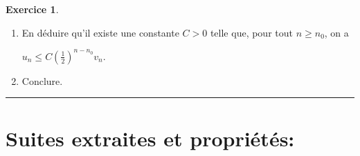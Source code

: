 \documentclass[a4paper,11pt]{article}
\theoremstyle{definition}
\newtheorem{exo}{Exercice} %
\begin{document}
\begin{minipage}{1\linewidth}
\begin{minipage}[t]{0.48\linewidth}
\begin{exo}
\begin{enumerate}
				\raggedright
				\item En déduire qu'il existe une constante $C>0$ telle que, pour tout $n\geq n_0$, on a
				
				\centering$u_n\leq C\left(\frac 12\right)^{n-n_0}v_n.$
				
				\raggedright
				\item Conclure.
			\end{enumerate}
			
			\centering
			\rule{1\linewidth}{0.6pt}
		\end{exo}
		
		
		
		
	\end{minipage}
\end{minipage}


\section*{Suites extraites et propriétés:}\hfill\\%
\end{document}
